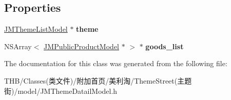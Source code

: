 \subsection*{Properties}
\begin{DoxyCompactItemize}
\item 
\mbox{\label{interface_j_m_theme_datail_model_a61fefe17fbe9ae02ded971312040a3e4}} 
\mbox{\hyperlink{interface_j_m_theme_list_model}{J\+M\+Theme\+List\+Model}} $\ast$ {\bfseries theme}
\item 
\mbox{\label{interface_j_m_theme_datail_model_a2d6304de3f75363f3312ab7f61f4ca19}} 
N\+S\+Array$<$ \mbox{\hyperlink{interface_j_m_public_product_model}{J\+M\+Public\+Product\+Model}} $\ast$ $>$ $\ast$ {\bfseries goods\+\_\+list}
\end{DoxyCompactItemize}


The documentation for this class was generated from the following file\+:\begin{DoxyCompactItemize}
\item 
T\+H\+B/\+Classes(类文件)/附加首页/美利淘/\+Theme\+Street(主题街)/model/J\+M\+Theme\+Datail\+Model.\+h\end{DoxyCompactItemize}
